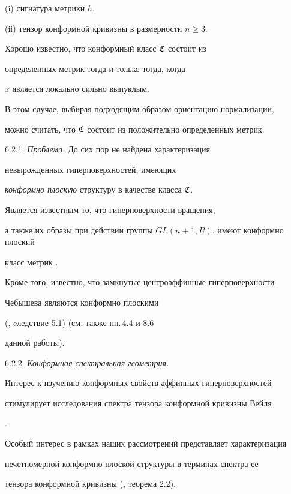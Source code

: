 (i) сигнатура метрики $h$,



(ii) тензор конформной кривизны в размерности $n \geq 3$.



\noindent{}Хорошо известно, что конформный класс $\frak C$ состоит из

определенных метрик тогда и только тогда, когда

$x$ является локально сильно выпуклым.

В этом случае, выбирая подходящим образом ориентацию нормализации,

можно считать, что $\frak C$ состоит из положительно определенных метрик.

\smallskip



6.2.1. {\it Проблема.} До сих пор не найдена характеризация

невырожденных гиперповерхностей, имеющих

{\it конформно плоскую} структуру в качестве класса $\frak C$.

Является известным то, что гиперповерхности вращения,

а также их образы при действии группы $GL(n+1, R)$, имеют конформно плоский

класс метрик \cite{SCHA}.

Кроме того, известно, что замкнутые центроаффинные гиперповерхности

Чебышева являются конформно плоскими

(\cite{LIU-S-W}, cледствие 5.1) (см. также пп.\,4.4 и 8.6

данной работы).

\smallskip



6.2.2. {\it Конформная спектральная геометрия.}

Интерес к изучению конформных свойств аффинных гиперповерхностей

стимулирует исследования спектра тензора конформной кривизны Вейля

\cite{BLA-G-N-S}.

Особый интерес в рамках наших рассмотрений представляет характеризация

нечетномерной конформно плоской структуры в терминах спектра ее

тензора конформной кривизны (\cite{BLA-G-N-S}, теорема 2.2).

\medskip



